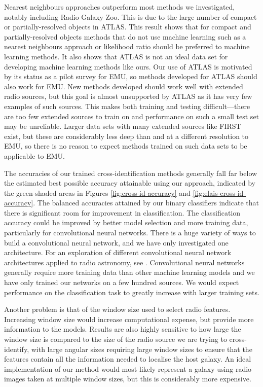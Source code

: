   Nearest neighbours approaches outperform most methods we investigated,
  notably including Radio Galaxy Zoo. This is due to the large number of
  compact or partially-resolved objects in ATLAS. This result shows that for
  compact and partially-resolved objects methods that do not use machine
  learning such as a nearest neighbours approach or likelihood ratio
  \citep{weston18lrpy} should be preferred to machine learning methods. It
  also shows that ATLAS is not an ideal data set for developing machine
  learning methods like ours. Our use of ATLAS is motivated by its status as a
  pilot survey for EMU, so methods developed for ATLAS should also work for
  EMU. New methods developed should work well with extended radio sources, but
  this goal is almost unsupported by ATLAS as it has very few examples of such
  sources. This makes both training and testing difficult---there are too
  few extended sources to train on and performance on such a small test set
  may be unreliable. Larger data sets with many extended sources like FIRST
  exist, but these are considerably less deep than and at a different
  resolution to EMU, so there is no reason to expect methods trained on such
  data sets to be applicable to EMU.

  The accuracies of our trained cross-identification methods generally fall
  far below the estimated best possible accuracy attainable using our approach,
  indicated by the green-shaded areas in Figures \ref{fig:cross-id-accuracy} and
  \ref{fig:elais-cross-id-accuracy}. The balanced accuracies attained by our
  binary classifiers indicate that there is significant room for improvement
  in classification. The classification accuracy could be improved by better
  model selection and more training data, particularly for convolutional
  neural networks. There is a huge variety of ways to build a convolutional
  neural network, and we have only investigated one architecture. For an
  exploration of different convolutional neural network architectures applied
  to radio astronomy, see \citet{lukic18compact}. Convolutional neural
  networks generally require more training data than other machine learning
  models and we have only trained our networks on a few hundred sources. We
  would expect performance on the classification task to greatly increase
  with larger training sets.

  Another problem is that of the window size used to select radio features.
  Increasing window size would increase computational expense, but provide
  more information to the models. Results are also highly sensitive to how
  large the window size is compared to the size of the radio source we are
  trying to cross-identify, with large angular sizes requiring large window
  sizes to ensure that the features contain all the information needed to
  localise the host galaxy. An ideal implementation of our method would most
  likely represent a galaxy using radio images taken at multiple window
  sizes, but this is considerably more expensive.

